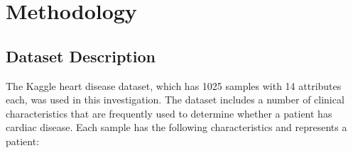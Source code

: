 \chapter{Methodology}
\label{ch:method} %


\section{Dataset Description}

The Kaggle heart disease dataset\cite{lapp-heart-disease-dataset-1988}, which has 1025 samples with 14 attributes each, was used in this investigation. The dataset includes a number of clinical characteristics that are frequently used to determine whether a patient has cardiac disease. Each sample has the following characteristics and represents a patient:

